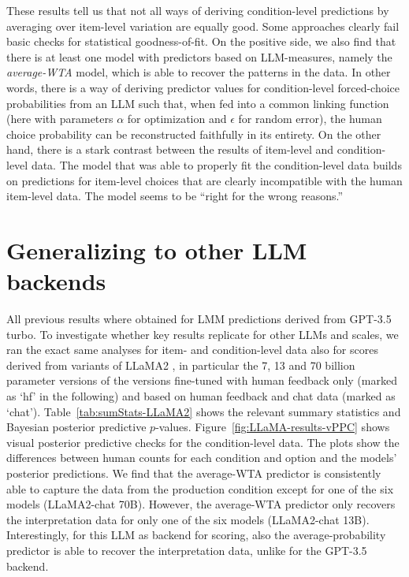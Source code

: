 \documentclass[fleqn]{article}
\begin{document}
These results tell us that not all ways of deriving condition-level predictions by averaging over item-level variation are equally good.
Some approaches clearly fail basic checks for statistical goodness-of-fit.
On the positive side, we also find that there is at least one model with predictors based on LLM-measures, namely the \emph{average-WTA} model, which is able to recover the patterns in the data.
In other words, there is a way of deriving predictor values for condition-level forced-choice probabilities from an LLM such that, when fed into a common linking function (here with parameters $\alpha$ for optimization and $\epsilon$ for random error), the human choice probability can be reconstructed faithfully in its entirety.
On the other hand, there is a stark contrast between the results of item-level and condition-level data.
The model that was able to properly fit the condition-level data builds on predictions for item-level choices that are clearly incompatible with the human item-level data.
The model seems to be ``right for the wrong reasons.''

\section{Generalizing to other LLM backends}
\label{sec:gener-other-llm}

All previous results where obtained for LMM predictions derived from GPT-3.5 turbo.
To investigate whether key results replicate for other LLMs and scales, we ran the exact same analyses for item- and condition-level data also for scores derived from variants of LLaMA2 \citep{TouvronLavril2023:LLaMA:-Open-and}, in particular the 7, 13 and 70 billion parameter versions of the versions fine-tuned with human feedback only (marked as `hf' in the following) and based on human feedback and chat data (marked as `chat').
Table~\ref{tab:sumStats-LLaMA2} shows the relevant summary statistics and Bayesian posterior predictive $p$-values.
Figure~\ref{fig:LLaMA-results-vPPC} shows visual posterior predictive checks for the condition-level data.
The plots show the differences between human counts for each condition and option and the models' posterior predictions.
We find that the average-WTA predictor is consistently able to capture the data from the production condition except for one of the six models (LLaMA2-chat 70B).
However, the average-WTA predictor only recovers the interpretation data for only one of the six models (LLaMA2-chat 13B).
Interestingly, for this LLM as backend for scoring, also the average-probability predictor is able to recover the interpretation data, unlike for the GPT-3.5 backend.
\end{document}
